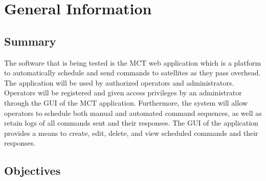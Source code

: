\documentclass[12pt, titlepage]{article}
\begin{document}
\section{General Information}

\subsection{Summary}

The software that is being tested is the MCT web application which is a platform to automatically schedule and send commands to satellites as they
pass overhead. The application will be used by authorized operators and administrators. Operators will be registered and given access privileges by an administrator through the GUI of the MCT application. Furthermore, the system will allow operators to schedule both manual and automated command sequences, as well as retain logs of all commands sent and their responses. The GUI of the application provides a means to create, edit, delete, and view scheduled commands and their responses.

\subsection{Objectives}
\end{document}
